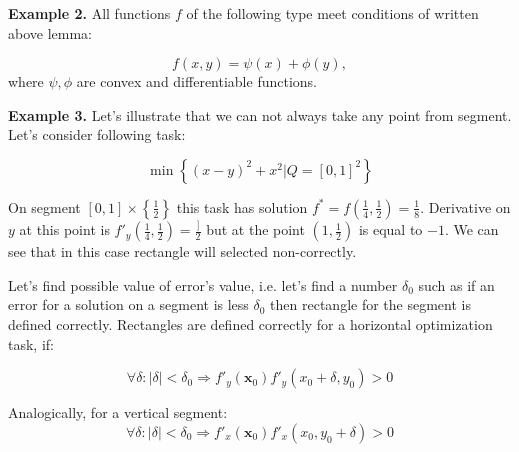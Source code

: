\documentclass[12pt]{article}
\begin{document}
\textbf{Example 2.} All functions $f$ of the following type meet conditions of written above lemma:

$$f(x, y) = \psi(x) + \phi(y),$$
where $\psi, \phi$ are convex and differentiable functions.

\textbf{Example 3.} Let's illustrate that we can not always take any point from segment. Let's consider following task:

$$\min\left\{(x-y)^2 + x^2\Big|Q = [0,1]^2\right\}$$

On segment $[0,1]\times\left\{\frac{1}{2}\right\}$ this task has solution $f^* = f\left(\frac{1}{4}, \frac{1}{2}\right) = \frac{1}{8}$. Derivative on $y$ at this point is $f'_y\left(\frac{1}{4}, \frac{1}{2}\right) = \frac{]}{2}$ but at the point $\left(1, \frac{1}{2}\right)$ is equal to $-1$. We can see that in this case rectangle will selected non-correctly.

Let's find possible value of error's value, i.e. let's find a number $\delta_0$ such as if an error for   a solution on a segment is less $\delta_0$ then rectangle for the segment is defined correctly. Rectangles are defined correctly for a horizontal optimization task, if:

\begin{equation}\label{MCH}
\forall\delta : |\delta| < \delta_0 \Rightarrow f'_y(\textbf{x}_0)f'_y(x_0+\delta, y_0) > 0
\end{equation}

Analogically, for a vertical segment:
\begin{equation}\label{MCV}
\forall\delta: |\delta| < \delta_0 \Rightarrow f'_x(\textbf{x}_0)f'_x(x_0, y_0+\delta) > 0
\end{equation}
\end{document}
